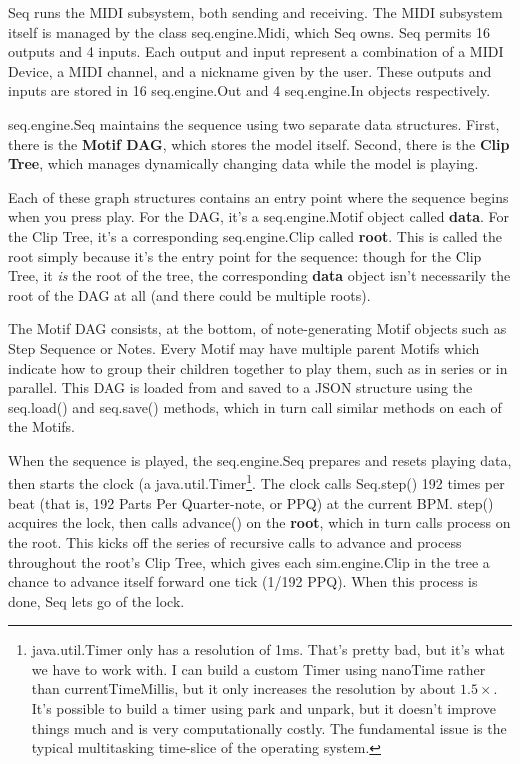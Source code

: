 \documentclass[twoside,10pt]{article}
\begin{document}
Seq runs the MIDI subsystem, both sending and receiving.  The MIDI subsystem itself is managed by the class {\sf seq.engine.Midi}, which Seq owns.  Seq permits 16 outputs and 4 inputs.  Each output and input represent a combination of a MIDI Device, a MIDI channel, and a nickname given by the user.  These outputs and inputs are stored in 16 {\sf seq.engine.Out} and 4 {\sf seq.engine.In} objects respectively.

{\sf seq.engine.Seq} maintains the sequence using two separate data structures.  First, there is the {\bf Motif DAG}, which stores the model itself.  Second, there is the {\bf Clip Tree}, which manages dynamically changing data while the model is playing.  

Each of these graph structures contains an entry point where the sequence begins when you press play.  For the DAG, it's a {\sf seq.engine.Motif} object called {\bf data}.  For the Clip Tree, it's a corresponding {\sf seq.engine.Clip} called {\bf root}.  This is called the root simply because it's the entry point for the sequence: though for the Clip Tree, it {\it is} the root of the tree, the corresponding {\bf data} object isn't necessarily the root of the DAG at all (and there could be multiple roots).

The Motif DAG consists, at the bottom, of note-generating Motif objects such as Step Sequence or Notes.  Every Motif may have multiple parent Motifs which indicate how to group their children together to play them, such as in series or in parallel.  This DAG is loaded from and saved to a JSON structure using the {\sf seq.load()} and {\sf seq.save()} methods, which in turn call similar methods on each of the Motifs.

When the sequence is played, the {\sf seq.engine.Seq} prepares and resets playing data, then starts the clock (a {\sf java.util.Timer}\footnote{{\sf java.util.Timer} only has a resolution of 1ms.  That's pretty bad, but it's what we have to work with.  I can build a custom Timer using nanoTime rather than currentTimeMillis, but it only increases the resolution by about \(1.5\times\).  It's possible to build a timer using park and unpark, but it doesn't improve things much and is very computationally costly.  The fundamental issue is the typical multitasking time-slice of the operating system.}.  The clock calls {\sf Seq.step()} 192 times per beat (that is, 192 Parts Per Quarter-note, or PPQ) at the current BPM. {\sf step()} acquires the lock, then calls {\sf advance()} on the {\bf root}, which in turn calls {\sf process} on the root.  This kicks off the series of recursive calls to {\sf advance} and {\sf process} throughout the root's Clip Tree, which gives each {\sf sim.engine.Clip} in the tree a chance to advance itself forward one tick (1/192 PPQ).  When this process is done, Seq lets go of the lock.
\end{document}
